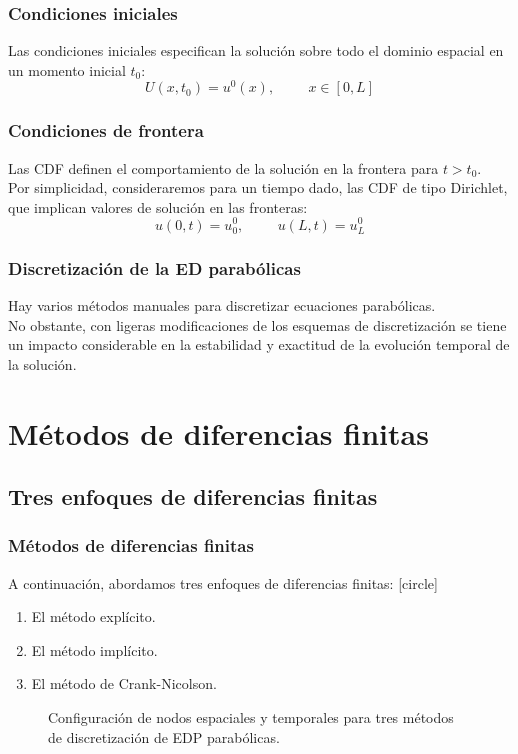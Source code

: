 \begin{frame}
\frametitle{Condiciones iniciales}
Las condiciones iniciales especifican la solución sobre todo el dominio espacial en un momento inicial $t_{0}$:
\begin{equation}
U(x, t_{0}) = u^{0} (x), \hspace{1cm} x \in [0, L]
\label{eq:ecuacion_13_38}
\end{equation}
\end{frame}
\begin{frame}
\frametitle{Condiciones de frontera}
Las CDF definen el comportamiento de la solución en la frontera para $t > t_{0}$.
\\
\bigskip
Por simplicidad, consideraremos para un tiempo dado, las CDF de tipo Dirichlet, que implican valores de solución en las fronteras:
\begin{equation}
u(0, t) = u_{0}^{0}, \hspace{1cm} u(L, t) = u_{L}^{0}
\label{eq:ecuacion_13_39}
\end{equation}
\end{frame}
\begin{frame}
\frametitle{Discretización de la ED parabólicas}
Hay varios métodos manuales para discretizar ecuaciones parabólicas.
\\
\bigskip
No obstante, con ligeras modificaciones de los esquemas de discretización se tiene un impacto considerable en la estabilidad y exactitud de la evolución temporal de la solución.
\end{frame}
\section{Métodos de diferencias finitas}
\subsection{Tres enfoques de diferencias finitas}
\begin{frame}
\frametitle{Métodos de diferencias finitas}
A continuación, abordamos tres enfoques de diferencias finitas:
[circle]
\begin{enumerate}[<+->]
\item El método explícito.
\item El método implícito.
\item El método de Crank-Nicolson.
\end{enumerate}
\end{frame}
\begin{frame}
\captionsetup{font=scriptsize,labelfont=scriptsize}
\begin{figure}
	\centering
	
	\caption{Configuración de nodos espaciales y temporales para tres métodos de discretización de EDP parabólicas.}
\end{figure}
\end{frame}
